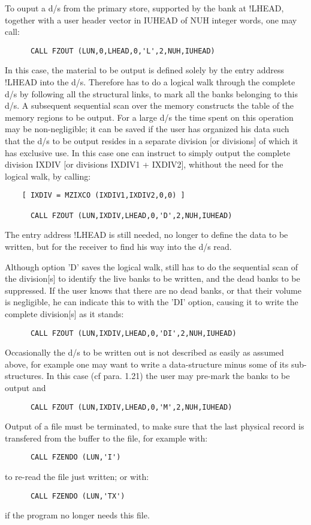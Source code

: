To ouput a d/s from the primary store,
supported by the bank at !LHEAD,
together with a user header vector in IUHEAD of NUH integer words,
one may call:
\begin{verbatim}
      CALL FZOUT (LUN,0,LHEAD,0,'L',2,NUH,IUHEAD)
\end{verbatim}
In this case, the material to be output is defined solely by
the entry address !LHEAD into the d/s.
Therefore  has to do a logical walk through the complete d/s
by following all the structural links, to mark all the banks
belonging to this d/s.
A subsequent sequential scan over the memory constructs
the table of the memory regions to be output.
For a large d/s the time spent on this operation may be
non-negligible;
it can be saved if the user has organized his data such
that the d/s to be output resides in a separate division
[or divisions] of which it has exclusive use.
In this case one can instruct  to simply
output the complete division IXDIV [or divisions IXDIV1 + IXDIV2],
whithout the need for the logical walk, by calling:
\begin{verbatim}
    [ IXDIV = MZIXCO (IXDIV1,IXDIV2,0,0) ]

      CALL FZOUT (LUN,IXDIV,LHEAD,0,'D',2,NUH,IUHEAD)
\end{verbatim}
The entry address !LHEAD is still needed,
no longer to define the data to be written,
but for the receiver to find his way into the d/s read.

Although option 'D' saves the logical walk,
 still has to do the sequential scan of the division[s]
to identify the live banks to be written,
and the dead banks to be suppressed.
If the user knows that there are no dead banks,
or that their volume is negligible,
he can indicate this to  with the 'DI' option,
causing it to write the complete division[s] as it stands:
\begin{verbatim}
      CALL FZOUT (LUN,IXDIV,LHEAD,0,'DI',2,NUH,IUHEAD)
\end{verbatim}

Occasionally the d/s to be written out is not described
as easily as assumed above,
for example one may want to write a data-structure
minus some of its sub-structures.
In this case (cf para. 1.21) the user may pre-mark
the banks to be output and
\begin{verbatim}
      CALL FZOUT (LUN,IXDIV,LHEAD,0,'M',2,NUH,IUHEAD)
\end{verbatim}
Output of a file must be terminated,
to make sure that the last physical record is transfered
from the buffer to the file, for example with:
\begin{verbatim}
      CALL FZENDO (LUN,'I')
\end{verbatim}
to re-read the file just written; or with:
\begin{verbatim}
      CALL FZENDO (LUN,'TX')
\end{verbatim}
if the program no longer needs this file.

